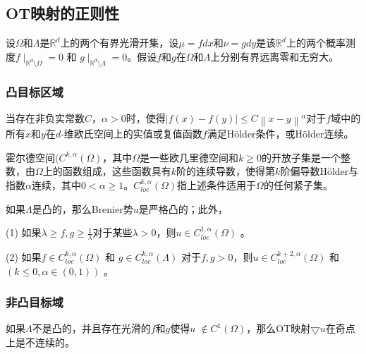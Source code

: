 \subsection{OT映射的正则性}

设$\Omega$和$\Lambda$是$\mathbb{R}^d$上的两个有界光滑开集，设$\mu=fdx$和$\nu=gdy$是该$\mathbb{R}^d$上的两个概率测度$f\mid _{\mathbb{R}^d \setminus \Omega }=0$ 和 $g\mid _{\mathbb{R}^d \setminus \Lambda }=0$。假设$f$和$g$在$\Omega$和$\Lambda$上分别有界远离零和无穷大。

\subsubsection{凸目标区域}

\begin{definition}[Hölder连续]
	当存在非负实常数$C$，$\alpha>0$时，使得$\left | f(x)-f(y) \right | \le C \left \| x-y \right \|^{\alpha }$对于$f$域中的所有$x$和$y$在$d$-维欧氏空间上的实值或复值函数$f$满足Hölder条件，或Hölder连续。
	\label{definition:3.5}
\end{definition}

\begin{definition}[Hölder空间]
	霍尔德空间$(C^{k,\alpha}(\Omega)$，其中$\Omega$是一些欧几里德空间和$k \ge 0$的开放子集是一个整数，由$\Omega$上的函数组成，这些函数具有$k$阶的连续导数，使得第$k$阶偏导数Hölder与指数$\alpha$连续，其中$0<\alpha \ge 1$。$C_{loc} ^{k,\alpha} (\Omega)$指上述条件适用于$\Omega$的任何紧子集。
	\label{definition:3.6}
\end{definition}

\begin{theorem}[Caffarelli【45】]
	如果$\Lambda$是凸的，那么Brenier势$u$是严格凸的；此外，
	
	(1) 如果$\lambda \ge f, g \ge \frac{1}{\lambda}$对于某些$\lambda>0$，则$u \in C_{loc} ^{1,\alpha} (\Omega)$ 。
	
	(2) 如果$f \in C_{loc} ^{k,\alpha} (\Omega)$ 和 $g \in C_{loc} ^{k,\alpha} (\Lambda)$ 对于$f,g>0$，则$u \in C_{loc} ^{k+2,\alpha} (\Omega)$ 和 $(k \le 0, \alpha \in(0,1))$ 。
	
	\label{theorem:3.4}
\end{theorem}

\subsubsection{非凸目标域}

如果$\Lambda$不是凸的，并且存在光滑的$f$和$g$使得$u \notin C^1 (\Omega)$，那么OT映射$\bigtriangledown u$在奇点上是不连续的。


